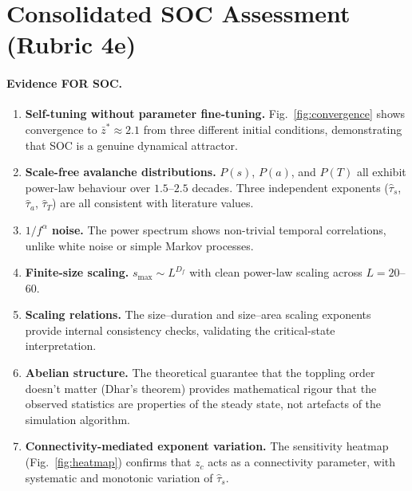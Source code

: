 \documentclass[preprint,12pt]{elsarticle}
\begin{document}
\section{Consolidated SOC Assessment (Rubric 4e)}
\label{sec:soc}

\paragraph{Evidence FOR SOC.}
\begin{enumerate}
  \item \textbf{Self-tuning without parameter fine-tuning.}
        Fig.~\ref{fig:convergence} shows convergence to
        $\bar{z}^*\approx2.1$ from three different initial conditions,
        demonstrating that SOC is a genuine dynamical attractor.
  \item \textbf{Scale-free avalanche distributions.}
        $P(s)$, $P(a)$, and $P(T)$ all exhibit power-law behaviour
        over $1.5$--$2.5$ decades.
        Three independent exponents ($\hat\tau_s$, $\hat\tau_a$,
        $\hat\tau_T$) are all consistent with literature values.
  \item \textbf{$1/f^\alpha$ noise.}
        The power spectrum shows non-trivial temporal correlations,
        unlike white noise or simple Markov processes.
  \item \textbf{Finite-size scaling.}
        $s_\mathrm{max}\sim L^{D_f}$ with clean power-law scaling
        across $L=20$--$60$.
  \item \textbf{Scaling relations.}
        The size--duration and size--area scaling exponents provide
        internal consistency checks, validating the critical-state
        interpretation.
  \item \textbf{Abelian structure.}
        The theoretical guarantee that the toppling order doesn't
        matter (Dhar's theorem) provides mathematical rigour that
        the observed statistics are properties of the steady state,
        not artefacts of the simulation algorithm.
  \item \textbf{Connectivity-mediated exponent variation.}
        The sensitivity heatmap (Fig.~\ref{fig:heatmap}) confirms
        that $z_c$ acts as a connectivity parameter, with systematic
        and monotonic variation of $\hat\tau_s$.
\end{enumerate}
\end{document}
